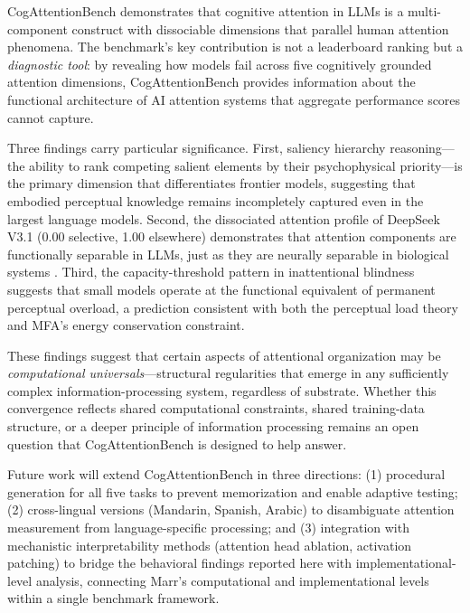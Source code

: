 \documentclass{article}
\begin{document}
CogAttentionBench demonstrates that cognitive attention in LLMs is a multi-component construct with dissociable dimensions that parallel human attention phenomena. The benchmark's key contribution is not a leaderboard ranking but a \emph{diagnostic tool}: by revealing how models fail across five cognitively grounded attention dimensions, CogAttentionBench provides information about the functional architecture of AI attention systems that aggregate performance scores cannot capture.

Three findings carry particular significance. First, saliency hierarchy reasoning---the ability to rank competing salient elements by their psychophysical priority---is the primary dimension that differentiates frontier models, suggesting that embodied perceptual knowledge remains incompletely captured even in the largest language models. Second, the dissociated attention profile of DeepSeek V3.1 (0.00 selective, 1.00 elsewhere) demonstrates that attention components are functionally separable in LLMs, just as they are neurally separable in biological systems \citep{posner1990}. Third, the capacity-threshold pattern in inattentional blindness suggests that small models operate at the functional equivalent of permanent perceptual overload, a prediction consistent with both the perceptual load theory \citep{lavie1995} and MFA's energy conservation constraint.

These findings suggest that certain aspects of attentional organization may be \emph{computational universals}---structural regularities that emerge in any sufficiently complex information-processing system, regardless of substrate. Whether this convergence reflects shared computational constraints, shared training-data structure, or a deeper principle of information processing remains an open question that CogAttentionBench is designed to help answer.

Future work will extend CogAttentionBench in three directions: (1) procedural generation for all five tasks to prevent memorization and enable adaptive testing; (2) cross-lingual versions (Mandarin, Spanish, Arabic) to disambiguate attention measurement from language-specific processing; and (3) integration with mechanistic interpretability methods (attention head ablation, activation patching) to bridge the behavioral findings reported here with implementational-level analysis, connecting Marr's \citep{marr1982} computational and implementational levels within a single benchmark framework.
\end{document}
